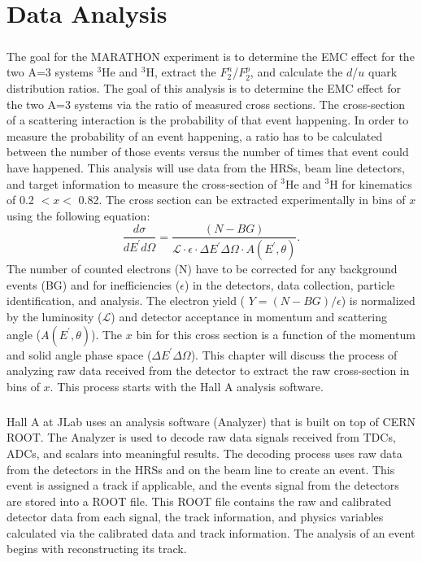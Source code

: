 	\chapter{Data Analysis}
\paragraph{}The goal for the MARATHON experiment is to determine the EMC effect for the two A=3 systems $^3$He and $^3$H, extract the  $F_2^n$/$F_2^p$, and calculate the $d$/$u$ quark distribution ratios. The goal of this analysis is to determine the EMC effect for the two A=3 systems via the ratio of measured cross sections. The cross-section of a scattering interaction is the probability of that event happening. In order to measure the probability of an event happening, a ratio has to be calculated between the number of those events versus the number of times that event could have happened. This analysis will use data from the HRSs, beam line detectors, and target information to measure the cross-section of $^3$He and $^3$H for kinematics of 0.2 $< x <$ 0.82. The cross section can be extracted experimentally in bins of $x$ using the following equation:
\begin{equation}
\dfrac{d\sigma}{dE^{\prime}d\Omega} = \frac{(N - BG)}{\mathscr{L} \cdot \epsilon \cdot \Delta E^{\prime} \Delta \Omega \cdot A(E^{\prime},\theta)}. \label{expcc}
\end{equation}
The number of counted electrons (N) have to be corrected for any background events (BG) and for inefficiencies ($\epsilon$) in the detectors, data collection, particle identification, and analysis. The electron yield ( $Y=(N-BG)/\epsilon$) is normalized by the luminosity ($\mathscr{L}$) and detector acceptance in momentum and scattering angle ($A(E^{\prime},\theta)$). The $x$ bin for this cross section is a function of the momentum and solid angle phase space ($\Delta E^{\prime} \Delta \Omega$). This chapter will discuss the process of analyzing raw data received from the detector to extract the raw cross-section in bins of $x$. This process starts with the Hall A analysis software.  
\paragraph{}Hall A at JLab uses an analysis software (Analyzer) that is built on top of CERN ROOT. The Analyzer is used to decode raw data signals received from TDCs, ADCs, and scalars into meaningful results. The decoding process uses raw data from the detectors in the HRSs and on the beam line to create an event. This event is assigned a track if applicable, and the events signal from the detectors are stored into a ROOT file. This ROOT file contains the raw and calibrated detector data from each signal, the track information, and physics variables calculated via the calibrated data and track information. The analysis of an event begins with reconstructing its track. 
